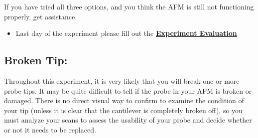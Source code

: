 \documentclass{../lab}
\begin{document}
If you have tried all three options, and you think the AFM is still not functioning properly, get assistance.

\begin{itemize}
    \item Last day of the experiment please fill out the \href{\ExperimentEvaluation}{\textbf{Experiment Evaluation}}

\end{itemize}

\subsection{Broken Tip:}
\label{subsec:BrokenTip}

Throughout this experiment, it is very likely that you will break one or more probe tips.  It may be quite difficult to tell if the probe in your AFM is broken or damaged.  There is no direct visual way to confirm to examine the condition of your tip (unless it is clear that the cantilever is completely broken off), so you must analyze your scans to assess the usability of your probe and decide whether or not it needs to be replaced.
\end{document}
